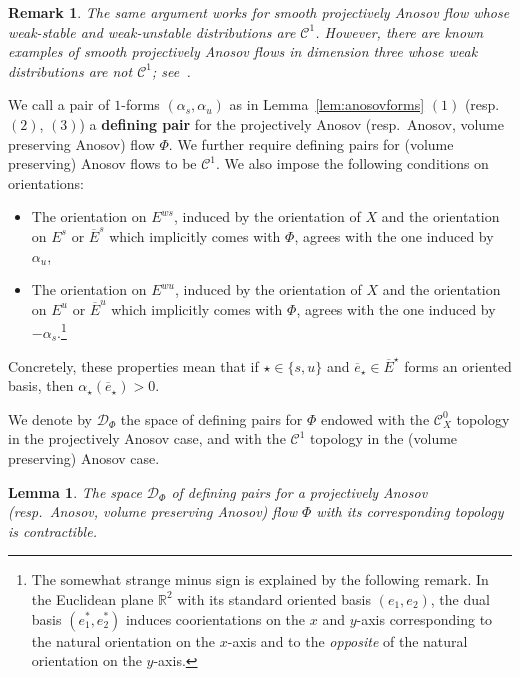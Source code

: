 \documentclass[letterpaper, 11pt]{article}
\numberwithin{equation}{section}
\newtheorem{lem}[thm]{Lemma}
\newtheorem{rem}[thm]{Remark}
\newcommand{\R}{\mathbb{R}}
\begin{document}
\begin{rem} The same argument works for smooth projectively Anosov flow whose weak-stable and weak-unstable distributions are $\mathcal{C}^1$. However, there are known examples of smooth projectively Anosov flows in dimension three whose weak distributions are not $\mathcal{C}^1$; see~\cite[Example 2.2.9]{ET}.
\end{rem}

We call a pair of $1$-forms $(\alpha_s, \alpha_u)$ as in Lemma~\ref{lem:anosovforms} $(1)$ (resp.~$(2)$, $(3)$) a \textbf{defining pair} for the projectively Anosov (resp.~Anosov, volume preserving Anosov) flow $\Phi$. We further require defining pairs for (volume preserving) Anosov flows to be $\mathcal{C}^1$. We also impose the following conditions on orientations:
\begin{itemize}
    \item The orientation on $E^{ws}$, induced by the orientation of $X$ and the orientation on $E^s$ or $\overline{E}^s$ which implicitly comes with $\Phi$, agrees with the one induced by $\alpha_u$,
    \item The orientation on $E^{wu}$, induced by the orientation of $X$ and the orientation on $E^u$ or $\overline{E}^u$ which implicitly comes with $\Phi$, agrees with the one induced by $- \alpha_s$.\footnote{The somewhat strange minus sign is explained by the following remark. In the Euclidean plane $\R^2$ with its standard oriented basis $(e_1, e_2)$, the dual basis $(e^*_1, e^*_2)$ induces coorientations on the $x$ and $y$-axis corresponding to the natural orientation on the $x$-axis and to the \emph{opposite} of the natural orientation on the $y$-axis.}
\end{itemize}
Concretely, these properties mean that if $\star \in \{s,u\}$ and $\overline{e}_\star \in \overline{E}^\star$ forms an oriented basis, then $\alpha_\star(\overline{e}_\star) > 0$.

We denote by $\mathcal{D}_\Phi$ the space of defining pairs for $\Phi$ endowed with the $\mathcal{C}^0_X$ topology in the projectively Anosov case, and with the $\mathcal{C}^1$ topology in the (volume preserving) Anosov case.

\begin{lem} \label{lem:contract} The space $\mathcal{D}_\Phi$ of defining pairs for a projectively Anosov (resp.~Anosov, volume preserving Anosov) flow $\Phi$  with its corresponding topology is contractible.
\end{lem}
\end{document}
